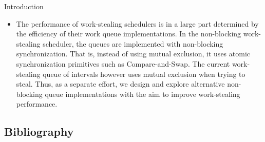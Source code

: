 \begin{frame}{Introduction}
  \begin{itemize}
  \item The performance of work-stealing schedulers is in a large part
    determined by the efficiency of their work queue
    implementations. In the non-blocking work-stealing scheduler, the
    queues are implemented with non-blocking synchronization. That is,
    instead of using mutual exclusion, it uses atomic synchronization
    primitives such as Compare-and-Swap. The current work-stealing
    queue of intervals however uses mutual exclusion when trying to
    steal. Thus, as a separate effort, we design and explore
    alternative non-blocking queue implementations with the aim to
    improve work-stealing performance.
  \end{itemize}
\end{frame}


\subsection{Bibliography}

